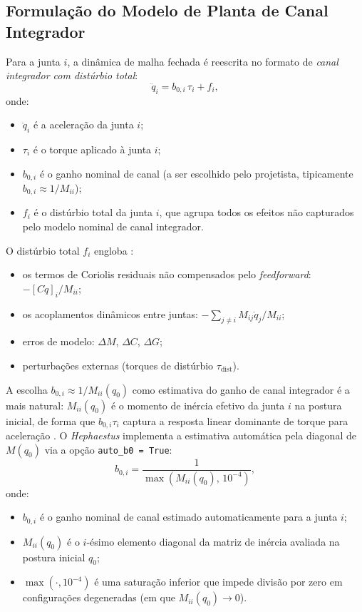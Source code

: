 \subsection{Formulação do Modelo de Planta de Canal Integrador}

Para a junta $i$, a dinâmica de malha fechada é reescrita no formato de \textit{canal integrador com distúrbio total}:
\begin{equation}
    \ddot{q}_i = b_{0,i}\,\tau_i + f_i,
    \label{eq:adrc_plant_cap5}
\end{equation}
onde:
\begin{itemize}
    \item $\ddot{q}_i$ é a aceleração da junta $i$;
    \item $\tau_i$ é o torque aplicado à junta $i$;
    \item $b_{0,i}$ é o ganho nominal de canal (a ser escolhido pelo projetista, tipicamente $b_{0,i} \approx 1/M_{ii}$);
    \item $f_i$ é o distúrbio total da junta $i$, que agrupa todos os efeitos não capturados pelo modelo nominal de canal integrador.
\end{itemize}

O distúrbio total $f_i$ engloba \cite{gao2003scaling, huang2014active}:
\begin{itemize}
    \item os termos de Coriolis residuais não compensados pelo \textit{feedforward}: $-[C\dot{q}]_i / M_{ii}$;
    \item os acoplamentos dinâmicos entre juntas: $-\sum_{j \neq i} M_{ij}\ddot{q}_j / M_{ii}$;
    \item erros de modelo: $\Delta M$, $\Delta C$, $\Delta G$;
    \item perturbações externas (torques de distúrbio $\tau_{\text{dist}}$).
\end{itemize}

A escolha $b_{0,i} \approx 1/M_{ii}(q_0)$ como estimativa do ganho de canal integrador é a mais natural: $M_{ii}(q_0)$ é o momento de inércia efetivo da junta $i$ na postura inicial, de forma que $b_{0,i} \tau_i$ captura a resposta linear dominante de torque para aceleração \cite{gao2003scaling}. O \textit{Hephaestus} implementa a estimativa automática pela diagonal de $M(q_0)$ via a opção \texttt{auto\_b0 = True}:
\begin{equation}
    b_{0,i} = \frac{1}{\max(M_{ii}(q_0),\, 10^{-4})},
    \label{eq:b0_auto}
\end{equation}
onde:
\begin{itemize}
    \item $b_{0,i}$ é o ganho nominal de canal estimado automaticamente para a junta $i$;
    \item $M_{ii}(q_0)$ é o $i$-ésimo elemento diagonal da matriz de inércia avaliada na postura inicial $q_0$;
    \item $\max(\cdot, 10^{-4})$ é uma saturação inferior que impede divisão por zero em configurações degeneradas (em que $M_{ii}(q_0) \to 0$).
\end{itemize}

